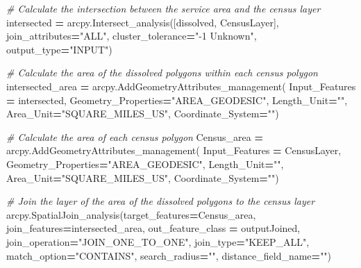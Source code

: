 \documentclass[11pt,]{article}
\newenvironment{Shaded}{\begin{snugshade}}{\end{snugshade}}
\newcommand{\StringTok}[1]{\textcolor[rgb]{0.31,0.60,0.02}{{#1}}}
\newcommand{\CommentTok}[1]{\textcolor[rgb]{0.56,0.35,0.01}{\textit{{#1}}}}
\newcommand{\OperatorTok}[1]{\textcolor[rgb]{0.81,0.36,0.00}{\textbf{{#1}}}}
\newcommand{\NormalTok}[1]{{#1}}
\begin{document}
\begin{Shaded}
\begin{Highlighting}[]
    \CommentTok{# Calculate the intersection between the service area and the census layer}
    \NormalTok{intersected }\OperatorTok{=} \NormalTok{arcpy.Intersect_analysis([dissolved, CensusLayer],}
                                           \NormalTok{join_attributes}\OperatorTok{=}\StringTok{"ALL"}\NormalTok{,}
                                           \NormalTok{cluster_tolerance}\OperatorTok{=}\StringTok{"-1 Unknown"}\NormalTok{,}
                                           \NormalTok{output_type}\OperatorTok{=}\StringTok{"INPUT"}\NormalTok{)}

    \CommentTok{# Calculate the area of the dissolved polygons within each census polygon}
    \NormalTok{intersected_area }\OperatorTok{=} \NormalTok{arcpy.AddGeometryAttributes_management(}
                                            \NormalTok{Input_Features }\OperatorTok{=} \NormalTok{intersected,}
                                            \NormalTok{Geometry_Properties}\OperatorTok{=}\StringTok{"AREA_GEODESIC"}\NormalTok{,}
                                            \NormalTok{Length_Unit}\OperatorTok{=}\StringTok{""}\NormalTok{,}
                                            \NormalTok{Area_Unit}\OperatorTok{=}\StringTok{"SQUARE_MILES_US"}\NormalTok{,}
                                            \NormalTok{Coordinate_System}\OperatorTok{=}\StringTok{""}\NormalTok{)}

    \CommentTok{# Calculate the area of each census polygon}
    \NormalTok{Census_area }\OperatorTok{=} \NormalTok{arcpy.AddGeometryAttributes_management(}
                                            \NormalTok{Input_Features }\OperatorTok{=} \NormalTok{CensusLayer,}
                                            \NormalTok{Geometry_Properties}\OperatorTok{=}\StringTok{"AREA_GEODESIC"}\NormalTok{,}
                                                        \NormalTok{Length_Unit}\OperatorTok{=}\StringTok{""}\NormalTok{,}
                                                        \NormalTok{Area_Unit}\OperatorTok{=}\StringTok{"SQUARE_MILES_US"}\NormalTok{,}
                                                        \NormalTok{Coordinate_System}\OperatorTok{=}\StringTok{""}\NormalTok{)}

    \CommentTok{# Join the layer of the area of the dissolved polygons to the census layer}
    \NormalTok{arcpy.SpatialJoin_analysis(target_features}\OperatorTok{=}\NormalTok{Census_area,}
                        \NormalTok{join_features}\OperatorTok{=}\NormalTok{intersected_area,}
                        \NormalTok{out_feature_class }\OperatorTok{=} \NormalTok{outputJoined,}
                        \NormalTok{join_operation}\OperatorTok{=}\StringTok{"JOIN_ONE_TO_ONE"}\NormalTok{,}
                        \NormalTok{join_type}\OperatorTok{=}\StringTok{"KEEP_ALL"}\NormalTok{,}
                        \NormalTok{match_option}\OperatorTok{=}\StringTok{"CONTAINS"}\NormalTok{,}
                        \NormalTok{search_radius}\OperatorTok{=}\StringTok{""}\NormalTok{,}
                        \NormalTok{distance_field_name}\OperatorTok{=}\StringTok{""}\NormalTok{)}


\end{Highlighting}
\end{Shaded}
\end{document}
